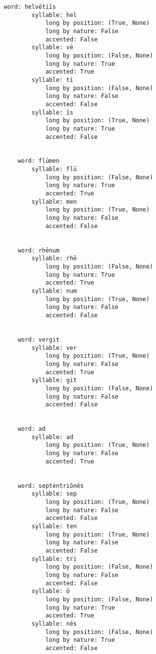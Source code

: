 \documentclass[11pt]{article}
\begin{document}
\begin{Verbatim}[commandchars=\\\{\}]
	word: helvētiīs
		syllable: hel
			long by position: (True, None)
			long by nature: False
			accented: False
		syllable: vē
			long by position: (False, None)
			long by nature: True
			accented: True
		syllable: ti
			long by position: (False, None)
			long by nature: False
			accented: False
		syllable: īs
			long by position: (True, None)
			long by nature: True
			accented: False


	word: flūmen
		syllable: flū
			long by position: (False, None)
			long by nature: True
			accented: True
		syllable: men
			long by position: (True, None)
			long by nature: False
			accented: False


	word: rhēnum
		syllable: rhē
			long by position: (False, None)
			long by nature: True
			accented: True
		syllable: num
			long by position: (True, None)
			long by nature: False
			accented: False


	word: vergit
		syllable: ver
			long by position: (True, None)
			long by nature: False
			accented: True
		syllable: git
			long by position: (False, None)
			long by nature: False
			accented: False


	word: ad
		syllable: ad
			long by position: (True, None)
			long by nature: False
			accented: True


	word: septentriōnēs
		syllable: sep
			long by position: (True, None)
			long by nature: False
			accented: False
		syllable: ten
			long by position: (True, None)
			long by nature: False
			accented: False
		syllable: tri
			long by position: (False, None)
			long by nature: False
			accented: False
		syllable: ō
			long by position: (False, None)
			long by nature: True
			accented: True
		syllable: nēs
			long by position: (False, None)
			long by nature: True
			accented: False





    \end{Verbatim}


    
    
    
    
\end{document}
